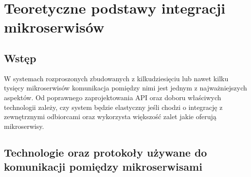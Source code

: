 \chapter{Teoretyczne podstawy integracji mikroserwisów}
\section{Wstęp}
W systemach rozproszonych zbudowanych z kilkudziesięciu lub nawet kilku tysięcy mikroserwisów komunikacja pomiędzy nimi jest jednym z najważniejszych aspektów. Od poprawnego zaprojektowania API oraz doboru właściwych technologii zależy, czy system będzie elastyczny jeśli chodzi o integrację z zewnętrznymi odbiorcami oraz wykorzysta większość zalet jakie oferują mikroserwisy.
\section{Technologie oraz protokoły używane do komunikacji pomiędzy mikroserwisami}

